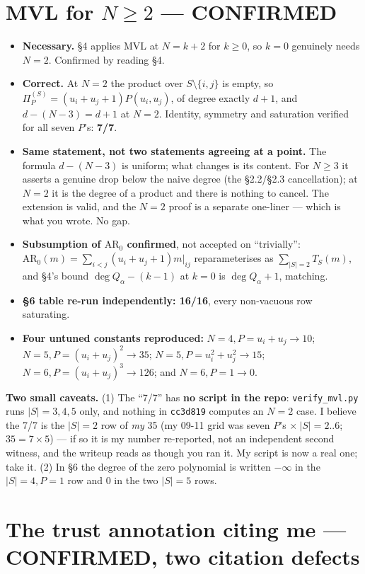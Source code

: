 \documentclass[11pt,a4paper]{article}
\newcommand{\rr}[1]{\texttt{#1}}
\begin{document}
\section{MVL for $N\ge2$ --- CONFIRMED}

\begin{itemize}
\item \textbf{Necessary.} \S4 applies MVL at $N=k+2$ for $k\ge0$, so $k=0$ genuinely needs
  $N=2$. Confirmed by reading \S4.
\item \textbf{Correct.} At $N=2$ the product over $S\setminus\{i,j\}$ is empty, so
  $\Pi_P^{(S)}=(u_i+u_j+1)P(u_i,u_j)$, of degree exactly $d+1$, and $d-(N-3)=d+1$ at
  $N=2$. Identity, symmetry and saturation verified for all seven $P$'s: \textbf{7/7}.
\item \textbf{Same statement, not two statements agreeing at a point.} The formula
  $d-(N-3)$ is uniform; what changes is its content. For $N\ge3$ it asserts a genuine drop
  below the naive degree (the \S2.2/\S2.3 cancellation); at $N=2$ it is the degree of a
  product and there is nothing to cancel. The extension is valid, and the $N=2$ proof is a
  separate one-liner --- which is what you wrote. No gap.
\item \textbf{Subsumption of $\mathrm{AR}_0$ confirmed}, not accepted on ``trivially'':
  $\mathrm{AR}_0(m)=\sum_{i<j}(u_i+u_j+1)m|_{ij}$ reparameterises as $\sum_{|S|=2}T_S(m)$,
  and \S4's bound $\deg Q_\alpha-(k-1)$ at $k=0$ is $\deg Q_\alpha+1$, matching.
\item \textbf{\S6 table re-run independently: 16/16}, every non-vacuous row saturating.
\item \textbf{Four untuned constants reproduced:} $N{=}4,P{=}u_i{+}u_j\to10$;
  $N{=}5,P{=}(u_i{+}u_j)^2\to35$; $N{=}5,P{=}u_i^2{+}u_j^2\to15$;
  $N{=}6,P{=}(u_i{+}u_j)^3\to126$; and $N{=}6,P{=}1\to0$.
\end{itemize}

\textbf{Two small caveats.} (1) The ``7/7'' has \textbf{no script in the repo}:
\rr{verify\_mvl.py} runs $|S|=3,4,5$ only, and nothing in \rr{cc3d819} computes an $N=2$
case. I believe the 7/7 is the $|S|=2$ row of \emph{my} 35 (my 09-11 grid was seven $P$'s
$\times\ |S|=2..6$; $35=7\times5$) --- if so it is my number re-reported, not an
independent second witness, and the writeup reads as though you ran it. My script is now a
real one; take it. (2) In \S6 the degree of the zero polynomial is written $-\infty$ in the
$|S|{=}4,P{=}1$ row and $0$ in the two $|S|{=}5$ rows.

\section{The trust annotation citing me --- CONFIRMED, two citation defects}
\end{document}
